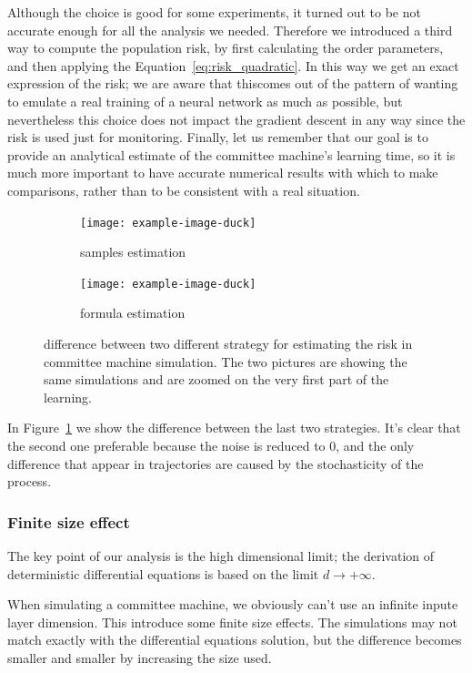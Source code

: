 Although the choice is good for some experiments, it turned out to be not accurate enough
for all the analysis we needed. Therefore we introduced a third way to compute the population 
risk, by first calculating the order parameters, and then applying the Equation~\eqref{eq:risk_quadratic}.
In this way we get an exact expression of the risk;
we are aware that thiscomes out of the pattern of wanting to emulate a real training of a neural network as much as possible,
but nevertheless this choice does not impact the gradient descent in any way since
the risk is used just for monitoring.
Finally, let us remember that our goal is to provide an analytical estimate of the committee machine's learning time,
so it is much more important to have accurate numerical results with which to make comparisons,
rather than to be consistent with a real situation.
\begin{figure}
  \centering
  \begin{subfigure}{0.495\textwidth}
    \texttt{[image: example-image-duck]}
    \caption{samples estimation}
  \end{subfigure}
  \begin{subfigure}{0.495\textwidth}
    \texttt{[image: example-image-duck]}
    \caption{formula estimation}
  \end{subfigure}

  \caption{
    difference between two different strategy for estimating the risk in committee machine simulation.
    The two pictures are showing the same simulations and are zoomed on the very first part of the learning.
  }
  \label{fig:sampling_formula_risk}
\end{figure}

In Figure~\ref{fig:sampling_formula_risk} we show the difference between the last two strategies.
It's clear that the second one preferable because the noise is reduced to 0, and the only difference
that appear in trajectories are caused by the stochasticity of the process.

\subsubsection{Finite size effect}
The key point of our analysis is the high dimensional limit; the derivation of 
deterministic differential equations is based on the limit \(d\to+\infty\).

When simulating a committee machine, we obviously can't use an infinite inpute layer dimension.
This introduce some finite size effects. The simulations may not match exactly with the 
differential equations solution, but the difference becomes smaller and smaller by 
increasing the size used. 

